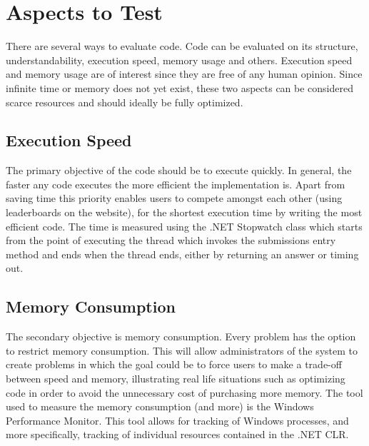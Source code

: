 \section{Aspects to Test}
There are several ways to evaluate code. Code can be evaluated on its structure, understandability, execution speed, memory usage and others. Execution speed and memory usage are of interest since they are free of any human opinion. Since infinite time or memory does not yet exist, these two aspects can be considered scarce resources and should ideally be fully optimized.


\subsection{Execution Speed}
The primary objective of the code should be to execute quickly. In general, the faster any code executes the more efficient the implementation is. Apart from saving time this priority enables users to compete amongst each other (using leaderboards on the website), for the shortest execution time by writing the most efficient code. 
The time is measured using the .NET Stopwatch class \cite{Stopwatch} which starts from the point of executing the thread which invokes the submissions entry method and ends when the thread ends, either by returning an answer or timing out. 


\subsection{Memory Consumption}
The secondary objective is memory consumption. Every problem has the option to restrict memory consumption. This will allow administrators of the system to create problems in which the goal could be to force users to make a trade-off between speed and memory, illustrating real life situations such as optimizing code in order to avoid the unnecessary cost of purchasing more memory.
The tool used to measure the memory consumption (and more) is the Windows Performance Monitor. This tool allows for tracking of Windows processes, and more specifically, tracking of individual resources contained in the .NET CLR.

